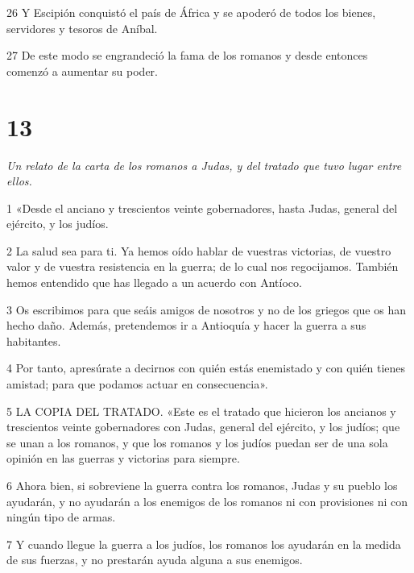 \par 26 Y Escipión conquistó el país de África y se apoderó de todos los bienes, servidores y tesoros de Aníbal.

\par 27 De este modo se engrandeció la fama de los romanos y desde entonces comenzó a aumentar su poder.

\chapter{13}

\par \textit{Un relato de la carta de los romanos a Judas, y del tratado que tuvo lugar entre ellos.}

\par 1 «Desde el anciano y trescientos veinte gobernadores, hasta Judas, general del ejército, y los judíos.

\par 2 La salud sea para ti. Ya hemos oído hablar de vuestras victorias, de vuestro valor y de vuestra resistencia en la guerra; de lo cual nos regocijamos. También hemos entendido que has llegado a un acuerdo con Antíoco.

\par 3 Os escribimos para que seáis amigos de nosotros y no de los griegos que os han hecho daño. Además, pretendemos ir a Antioquía y hacer la guerra a sus habitantes.

\par 4 Por tanto, apresúrate a decirnos con quién estás enemistado y con quién tienes amistad; para que podamos actuar en consecuencia».

\par 5 LA COPIA DEL TRATADO. «Este es el tratado que hicieron los ancianos y trescientos veinte gobernadores con Judas, general del ejército, y los judíos; que se unan a los romanos, y que los romanos y los judíos puedan ser de una sola opinión en las guerras y victorias para siempre.

\par 6 Ahora bien, si sobreviene la guerra contra los romanos, Judas y su pueblo los ayudarán, y no ayudarán a los enemigos de los romanos ni con provisiones ni con ningún tipo de armas.

\par 7 Y cuando llegue la guerra a los judíos, los romanos los ayudarán en la medida de sus fuerzas, y no prestarán ayuda alguna a sus enemigos.

